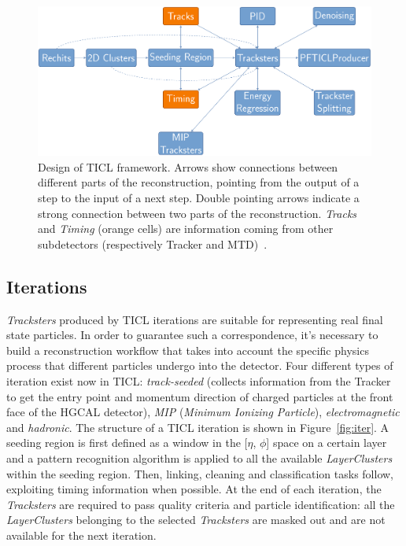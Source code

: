 \begin{figure}[tbp]
    \centering %
    \includegraphics[width=.9\textwidth]{chapters/HGCal/figures/chef/ticl.pdf} 
    \caption{\label{fig:ticl} Design of TICL framework. Arrows show connections between different parts of the reconstruction, pointing from the output of a step to the input of a next step. Double pointing arrows indicate a strong connection between two parts of the reconstruction. \emph{Tracks} and \emph{Timing} (orange cells) are information coming from other subdetectors (respectively Tracker and MTD)~\cite{ticlwebsite}.}
\end{figure}


\subsection{Iterations}
\label{sec:iter}

\emph{Tracksters} produced by TICL iterations are suitable for representing real final state particles. In order to guarantee such a correspondence, it's necessary to build a reconstruction workflow that takes into account the specific physics process that different particles undergo into the detector. Four different types of iteration exist now in TICL: \emph{track-seeded} (collects information from the Tracker to get the entry point and momentum direction of charged particles at the front face of the HGCAL detector), \emph{MIP} (\emph{Minimum Ionizing Particle}), \emph{electromagnetic} and \emph{hadronic}. The structure of a TICL iteration is shown in Figure~\ref{fig:iter}. A seeding region is first defined as a window in the [$\eta$, $\phi$] space on a certain layer and a pattern recognition algorithm is applied to all the available \emph{LayerClusters} within the seeding region. Then, linking, cleaning and classification tasks follow, exploiting timing information when possible. At the end of each iteration, the \emph{Tracksters} are required to pass quality criteria and particle identification: all the \emph{LayerClusters} belonging to the selected \emph{Tracksters} are masked out and are not available for the next iteration.

